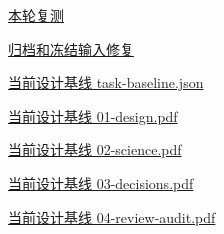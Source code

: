 \documentclass[11pt,a4paper]{article}
\begin{document}
\href{file:///D:/Agent/srp/agent/tasks/U12-01/evidence/verification.json}{本轮复测}


\href{file:///D:/Agent/srp/agent/tasks/U12-01/evidence/consumer-impact.md}{归档和冻结输入修复}


\href{file:///D:/Agent/srp/agent/design/design-foundation-20261008/task-baseline.json}{当前设计基线 task-\allowbreak{}baseline.json}


\href{file:///D:/Agent/srp/agent/design/design-foundation-20261008/01-design.pdf}{当前设计基线 01-\allowbreak{}design.pdf}


\href{file:///D:/Agent/srp/agent/design/design-foundation-20261008/02-science.pdf}{当前设计基线 02-\allowbreak{}science.pdf}


\href{file:///D:/Agent/srp/agent/design/design-foundation-20261008/03-decisions.pdf}{当前设计基线 03-\allowbreak{}decisions.pdf}


\href{file:///D:/Agent/srp/agent/design/design-foundation-20261008/04-review-audit.pdf}{当前设计基线 04-\allowbreak{}review-\allowbreak{}audit.pdf}
\end{document}
